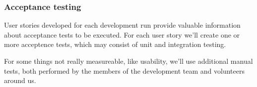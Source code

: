 \subsubsection{Acceptance testing}
User stories developed for each development run provide valuable information about acceptance tests to be executed. For each user story we'll create one or more acceptence tests, which may consist of unit and integration testing.

For some things not really measureable, like usability, we'll use additional manual tests, both performed by the members of the development team and volunteers around us.